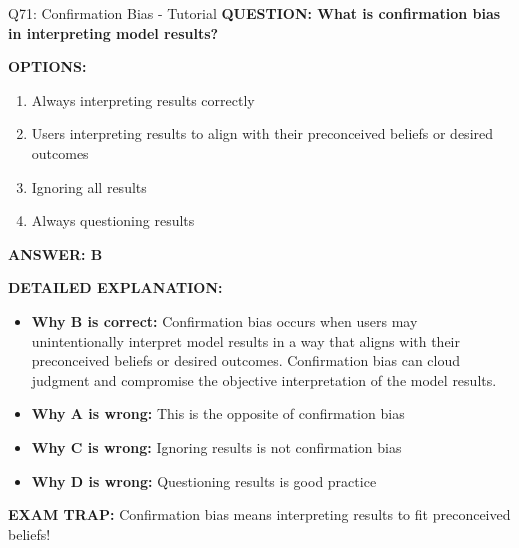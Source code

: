 \documentclass[8pt]{beamer}
\begin{document}
	\begin{frame}{Q71: Confirmation Bias - Tutorial}
		\fontsize{6.5}{7.5}\selectfont
		\textbf{QUESTION: What is confirmation bias in interpreting model results?}
		
		\vspace{0.1cm}
		\textbf{OPTIONS:}
		\begin{enumerate}
			\item Always interpreting results correctly
			\item Users interpreting results to align with their preconceived beliefs or desired outcomes
			\item Ignoring all results
			\item Always questioning results
		\end{enumerate}
		
		\vspace{0.1cm}
		\textcolor{myblue}{\textbf{ANSWER: B}}
		
		\vspace{0.1cm}
		\textbf{DETAILED EXPLANATION:}
		\begin{itemize}
			\item \textbf{Why B is correct:} Confirmation bias occurs when users may unintentionally interpret model results in a way that aligns with their preconceived beliefs or desired outcomes. Confirmation bias can cloud judgment and compromise the objective interpretation of the model results.
			\item \textbf{Why A is wrong:} This is the opposite of confirmation bias
			\item \textbf{Why C is wrong:} Ignoring results is not confirmation bias
			\item \textbf{Why D is wrong:} Questioning results is good practice
		\end{itemize}
		
		\textcolor{myred}{\textbf{EXAM TRAP:}} Confirmation bias means \textcolor{myblue}{interpreting results to fit preconceived beliefs}!
	\end{frame}
	
\end{document}
